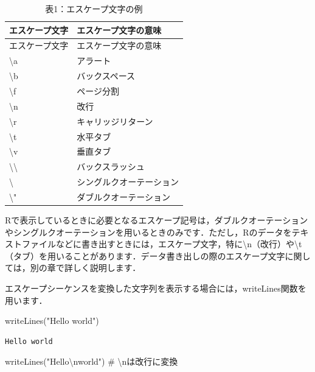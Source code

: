 \documentclass[
  letterpaper,
  DIV=11,
  numbers=noendperiod]{scrreprt}
\newenvironment{Shaded}{\begin{snugshade}}{\end{snugshade}}
\newcommand{\CommentTok}[1]{\textcolor[rgb]{0.37,0.37,0.37}{#1}}
\newcommand{\FunctionTok}[1]{\textcolor[rgb]{0.28,0.35,0.67}{#1}}
\newcommand{\NormalTok}[1]{\textcolor[rgb]{0.00,0.23,0.31}{#1}}
\newcommand{\SpecialCharTok}[1]{\textcolor[rgb]{0.37,0.37,0.37}{#1}}
\newcommand{\StringTok}[1]{\textcolor[rgb]{0.13,0.47,0.30}{#1}}
\begin{document}
\begin{longtable}[]{@{}ll@{}}
\caption{表1：エスケープ文字の例}\tabularnewline
\toprule()
エスケープ文字 & エスケープ文字の意味 \\
\midrule()
\endfirsthead
\toprule()
エスケープ文字 & エスケープ文字の意味 \\
\midrule()
\endhead
\textbackslash a & アラート \\
\textbackslash b & バックスペース \\
\textbackslash f & ページ分割 \\
\textbackslash n & 改行 \\
\textbackslash r & キャリッジリターン \\
\textbackslash t & 水平タブ \\
\textbackslash v & 垂直タブ \\
\textbackslash\textbackslash{} & バックスラッシュ \\
\textbackslash\textquotesingle{} & シングルクオーテーション \\
\textbackslash" & ダブルクオーテーション \\
\bottomrule()
\end{longtable}

Rで表示しているときに必要となるエスケープ記号は，ダブルクオーテーションやシングルクオーテーションを用いるときのみです．ただし，Rのデータをテキストファイルなどに書き出すときには，エスケープ文字，特に\textbackslash n（改行）や\textbackslash t（タブ）を用いることがあります．データ書き出しの際のエスケープ文字に関しては，別の章で詳しく説明します．

エスケープシーケンスを変換した文字列を表示する場合には，writeLines関数を用います．

\begin{Shaded}
\begin{Highlighting}[]
\FunctionTok{writeLines}\NormalTok{(}\StringTok{"Hello world"}\NormalTok{)}
\end{Highlighting}
\end{Shaded}

\begin{verbatim}
Hello world
\end{verbatim}

\begin{Shaded}
\begin{Highlighting}[]
\FunctionTok{writeLines}\NormalTok{(}\StringTok{"Hello}\SpecialCharTok{\textbackslash{}n}\StringTok{world"}\NormalTok{) }\CommentTok{\# \textbackslash{}nは改行に変換}
\end{Highlighting}
\end{Shaded}
\end{document}
